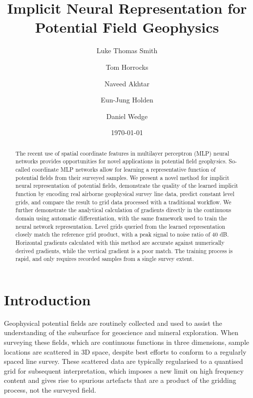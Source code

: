 % 
% 

\title{Implicit Neural Representation for Potential Field Geophysics}
\author[1*]{Luke Thomas Smith}
\author[1]{Tom Horrocks}
\author[2]{Naveed Akhtar}
\author[1]{Eun-Jung Holden}
\author[1]{Daniel Wedge}
\date{\today}

\begin{abstract}
    The recent use of spatial coordinate features in multilayer perceptron (MLP) neural networks provides opportunities for novel applications in potential field geophysics.
    So-called coordinate MLP networks allow for learning a representative function of potential fields from their surveyed samples.
    We present a novel method for implicit neural representation of potential fields, demonstrate the quality of the learned implicit function by encoding real airborne geophysical survey line data, predict constant level grids, and compare the result to grid data processed with a traditional workflow.
    We further demonstrate the analytical calculation of gradients directly in the continuous domain using automatic differentiation, with the same framework used to train the neural network representation.
    Level grids queried from the learned representation closely match the reference grid product, with a peak signal to noise ratio of 40 dB.
    Horizontal gradients calculated with this method are accurate against numerically derived gradients, while the vertical gradient is a poor match.
    The training process is rapid, and only requires recorded samples from a single survey extent.
\end{abstract}

\clearpage{}

\section{Introduction}
Geophysical potential fields are routinely collected and used to assist the understanding of the subsurface for geoscience and mineral exploration.
When surveying these fields, which are continuous functions in three dimensions, sample locations are scattered in 3D space, despite best efforts to conform to a regularly spaced line survey.
These scattered data are typically regularised to a quantised grid for subsequent interpretation, which imposes a new limit on high frequency content and gives rise to spurious artefacts that are a product of the gridding process, not the surveyed field.


